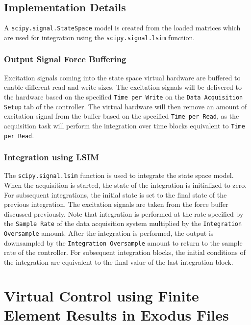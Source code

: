 \documentclass[pdf,12pt,report]{SANDreport}
\newcommand{\inlineCode}{\lstinline[basicstyle=\bfseries\ttfamily]}
\begin{document}
    \section{Implementation Details}
    \label{sec:state_space_integration}
    A \inlineCode{scipy.signal.StateSpace} model is created from the loaded matrices which are used for integration using the \inlineCode{scipy.signal.lsim} function.
    
    \subsection{Output Signal Force Buffering}
    Excitation signals coming into the state space virtual hardware are buffered to enable different read and write sizes.  The excitation signals will be delivered to the hardware based on the specified \inlineCode{Time per Write} on the \inlineCode{Data Acquisition Setup} tab of the controller.  The virtual hardware will then remove an amount of excitation signal from the buffer based on the specified \inlineCode{Time per Read}, as the acquisition task will perform the integration over time blocks equivalent to \inlineCode{Time per Read}.
        
    \subsection{Integration using LSIM}
    The \inlineCode{scipy.signal.lsim} function is used to integrate the state space model.  When the acquisition is started, the state of the integration is initialized to zero.  For subsequent integrations, the initial state is set to the final state of the previous integration.  The excitation signals are taken from the force buffer discussed previously.  Note that integration is performed at the rate specified by the \inlineCode{Sample Rate} of the data acquisition system multiplied by the \inlineCode{Integration Oversample} amount.  After the integration is performed, the output is downsampled by the \inlineCode{Integration Oversample} amount to return to the sample rate of the controller.  For subsequent integration blocks, the initial conditions of the integration are equivalent to the final value of the last integration block.
    
    \chapter{Virtual Control using Finite Element Results in Exodus Files}\label{sec:rattlesnake_hardware_virtual_control}
    
\end{document}
